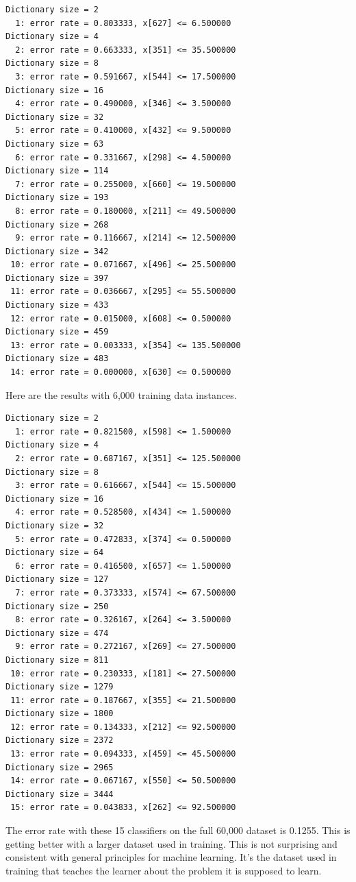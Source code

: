 \documentclass{article}
\begin{document}
\begin{verbatim}
Dictionary size = 2
  1: error rate = 0.803333, x[627] <= 6.500000
Dictionary size = 4
  2: error rate = 0.663333, x[351] <= 35.500000
Dictionary size = 8
  3: error rate = 0.591667, x[544] <= 17.500000
Dictionary size = 16
  4: error rate = 0.490000, x[346] <= 3.500000
Dictionary size = 32
  5: error rate = 0.410000, x[432] <= 9.500000
Dictionary size = 63
  6: error rate = 0.331667, x[298] <= 4.500000
Dictionary size = 114
  7: error rate = 0.255000, x[660] <= 19.500000
Dictionary size = 193
  8: error rate = 0.180000, x[211] <= 49.500000
Dictionary size = 268
  9: error rate = 0.116667, x[214] <= 12.500000
Dictionary size = 342
 10: error rate = 0.071667, x[496] <= 25.500000
Dictionary size = 397
 11: error rate = 0.036667, x[295] <= 55.500000
Dictionary size = 433
 12: error rate = 0.015000, x[608] <= 0.500000
Dictionary size = 459
 13: error rate = 0.003333, x[354] <= 135.500000
Dictionary size = 483
 14: error rate = 0.000000, x[630] <= 0.500000
 \end{verbatim}

Here are the results with 6,000 training data instances.
\begin{verbatim}
Dictionary size = 2
  1: error rate = 0.821500, x[598] <= 1.500000
Dictionary size = 4
  2: error rate = 0.687167, x[351] <= 125.500000
Dictionary size = 8
  3: error rate = 0.616667, x[544] <= 15.500000
Dictionary size = 16
  4: error rate = 0.528500, x[434] <= 1.500000
Dictionary size = 32
  5: error rate = 0.472833, x[374] <= 0.500000
Dictionary size = 64
  6: error rate = 0.416500, x[657] <= 1.500000
Dictionary size = 127
  7: error rate = 0.373333, x[574] <= 67.500000
Dictionary size = 250
  8: error rate = 0.326167, x[264] <= 3.500000
Dictionary size = 474
  9: error rate = 0.272167, x[269] <= 27.500000
Dictionary size = 811
 10: error rate = 0.230333, x[181] <= 27.500000
Dictionary size = 1279
 11: error rate = 0.187667, x[355] <= 21.500000
Dictionary size = 1800
 12: error rate = 0.134333, x[212] <= 92.500000
Dictionary size = 2372
 13: error rate = 0.094333, x[459] <= 45.500000
Dictionary size = 2965
 14: error rate = 0.067167, x[550] <= 50.500000
Dictionary size = 3444
 15: error rate = 0.043833, x[262] <= 92.500000
\end{verbatim}
The error rate with these 15 classifiers on the full 60,000 dataset is 0.1255.  This is getting better with a larger dataset used in training.  This is not surprising and consistent with general principles for machine learning.  It's the dataset used in training that teaches the learner about the problem it is supposed to learn.
\end{document}
